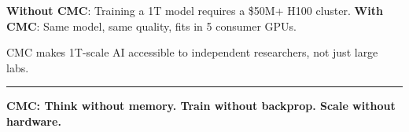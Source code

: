 \documentclass[
  11pt,
  a4paper,
]{article}
\begin{document}
\textbf{Without CMC}: Training a 1T model requires a \$50M+ H100
cluster. \textbf{With CMC}: Same model, same quality, fits in 5 consumer
GPUs.

CMC makes 1T-scale AI accessible to independent researchers, not just
large labs.

\begin{center}\rule{0.5\linewidth}{0.5pt}\end{center}

\textbf{CMC: Think without memory. Train without backprop. Scale without
hardware.}
\end{document}
